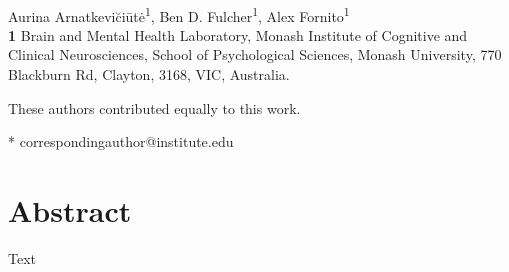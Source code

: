 \documentclass[10pt,letterpaper]{article}
\date{}
\begin{document}
\vspace*{0.2in}

\begin{flushleft}
{\Large
\textbf{} %
}
\newline
\\
Aurina Arnatkevi\u{c}i\={u}t\.{e}\textsuperscript{1\Yinyang},
Ben D. Fulcher\textsuperscript{1\Yinyang},
Alex Fornito\textsuperscript{1}\\
\bigskip
\textbf{1} Brain and Mental Health Laboratory, Monash Institute of Cognitive and Clinical Neurosciences, School of Psychological Sciences, Monash University, 770 Blackburn Rd, Clayton, 3168, VIC, Australia.
\\
\bigskip

%
%
\Yinyang These authors contributed equally to this work.





* correspondingauthor@institute.edu

\end{flushleft}
\section*{Abstract}
Text
\end{document}
